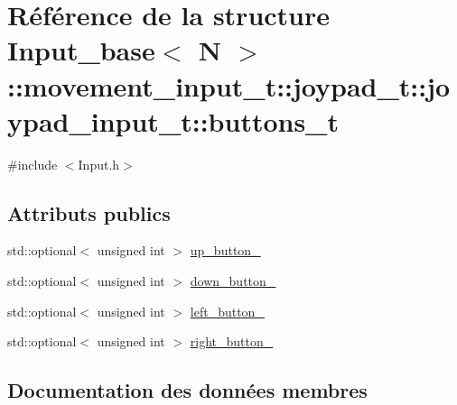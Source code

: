 \hypertarget{struct_input__base_1_1movement__input__t_1_1joypad__t_1_1joypad__input__t_1_1buttons__t}{}\section{Référence de la structure Input\+\_\+base$<$ N $>$\+:\+:movement\+\_\+input\+\_\+t\+:\+:joypad\+\_\+t\+:\+:joypad\+\_\+input\+\_\+t\+:\+:buttons\+\_\+t}
\label{struct_input__base_1_1movement__input__t_1_1joypad__t_1_1joypad__input__t_1_1buttons__t}


{\ttfamily \#include $<$Input.\+h$>$}

\subsection*{Attributs publics}
\begin{DoxyCompactItemize}
\item 
std\+::optional$<$ unsigned int $>$ \hyperlink{struct_input__base_1_1movement__input__t_1_1joypad__t_1_1joypad__input__t_1_1buttons__t_a239929c919634205fe86f61208515848}{up\+\_\+button\+\_\+}
\item 
std\+::optional$<$ unsigned int $>$ \hyperlink{struct_input__base_1_1movement__input__t_1_1joypad__t_1_1joypad__input__t_1_1buttons__t_a3c344e2a9fdce4a396d22af8a4be1df0}{down\+\_\+button\+\_\+}
\item 
std\+::optional$<$ unsigned int $>$ \hyperlink{struct_input__base_1_1movement__input__t_1_1joypad__t_1_1joypad__input__t_1_1buttons__t_a99d61f77f1486465196c4279d23f1bff}{left\+\_\+button\+\_\+}
\item 
std\+::optional$<$ unsigned int $>$ \hyperlink{struct_input__base_1_1movement__input__t_1_1joypad__t_1_1joypad__input__t_1_1buttons__t_a97e4219d56eb1f5fd903e391af1e65c8}{right\+\_\+button\+\_\+}
\end{DoxyCompactItemize}


\subsection{Documentation des données membres}
\mbox{\label{struct_input__base_1_1movement__input__t_1_1joypad__t_1_1joypad__input__t_1_1buttons__t_a3c344e2a9fdce4a396d22af8a4be1df0}} 
